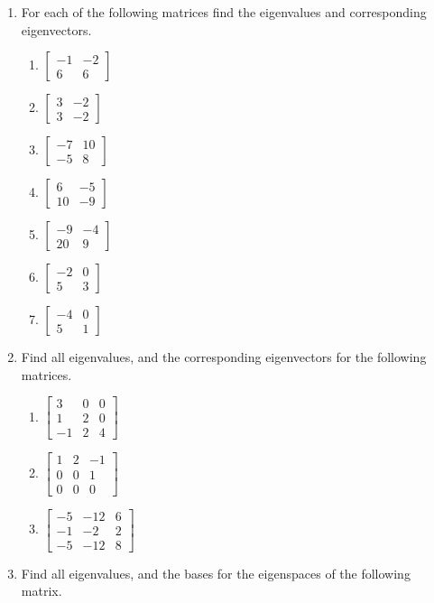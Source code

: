 \begin{enumerate}
\begin{enumerate}
\end{enumerate}
\item For each of the following matrices find the eigenvalues and
corresponding eigenvectors.
\begin{enumerate}
\item $ \left[ \begin{array}{rr} -1&-2\\ 6&6\end{array} \right]$
\item $ \left[ \begin{array}{rr} 3&-2\\ 3&-2\end{array} \right]$
\item $ \left[ \begin{array}{rr} -7&10\\ -5&8\end{array} \right]$
\item $ \left[ \begin{array}{rr} 6&-5\\ 10&-9\end{array} \right]$

\item $ \left[ \begin{array}{rr} -9&-4\\ 20&9\end{array} \right]$
\item $ \left[ \begin{array}{rr} -2&0\\ 5&3\end{array} \right]$
\item $ \left[ \begin{array}{rr} -4&0\\ 5&1\end{array} \right]$
\end{enumerate}
\item Find all eigenvalues, and the corresponding eigenvectors
for the following matrices.
\begin{enumerate}
\item $\left [\begin {array}{rrr} 3&0&0\\1&2&0
\\-1&2&4\end {array}\right ]$
\item $\left [\begin {array}{rrr} 1&2&-1\\0&0&1
\\0&0&0\end {array}\right ]$
\item $\left [\begin {array}{rrr} -5&-12&6\\-1&-2&2
\\-5&-12&8\end {array}\right ]$
\end{enumerate}
\item Find all eigenvalues, and the bases for the eigenspaces of the following matrix.


\end{enumerate}
